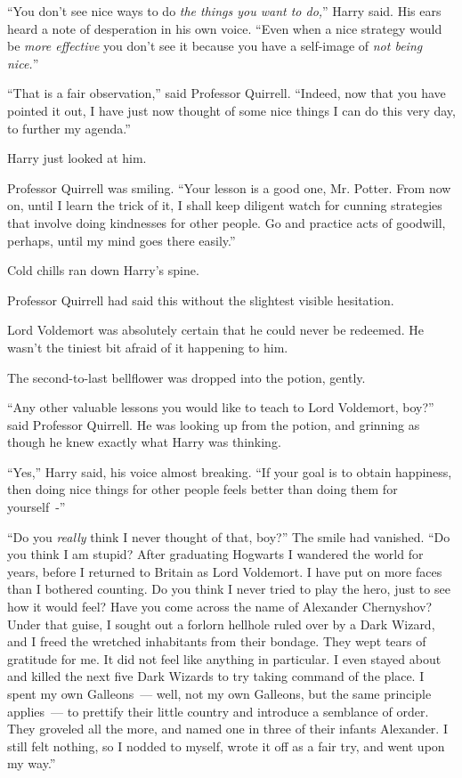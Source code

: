 ``You don't see nice ways to do \emph{the things you want to do,}'' Harry said. His ears heard a note of desperation in his own voice. ``Even when a nice strategy would be \emph{more effective} you don't see it because you have a self-image of \emph{not being nice.}''

``That is a fair observation,'' said Professor Quirrell. ``Indeed, now that you have pointed it out, I have just now thought of some nice things I can do this very day, to further my agenda.''

Harry just looked at him.

Professor Quirrell was smiling. ``Your lesson is a good one, Mr. Potter. From now on, until I learn the trick of it, I shall keep diligent watch for cunning strategies that involve doing kindnesses for other people. Go and practice acts of goodwill, perhaps, until my mind goes there easily.''

Cold chills ran down Harry's spine.

Professor Quirrell had said this without the slightest visible hesitation.

Lord Voldemort was absolutely certain that he could never be redeemed. He wasn't the tiniest bit afraid of it happening to him.

The second-to-last bellflower was dropped into the potion, gently.

``Any other valuable lessons you would like to teach to Lord Voldemort, boy?'' said Professor Quirrell. He was looking up from the potion, and grinning as though he knew exactly what Harry was thinking.

``Yes,'' Harry said, his voice almost breaking. ``If your goal is to obtain happiness, then doing nice things for other people feels better than doing them for yourself~-''

``Do you \emph{really} think I never thought of that, boy?'' The smile had vanished. ``Do you think I am stupid? After graduating Hogwarts I wandered the world for years, before I returned to Britain as Lord Voldemort. I have put on more faces than I bothered counting. Do you think I never tried to play the hero, just to see how it would feel? Have you come across the name of Alexander Chernyshov? Under that guise, I sought out a forlorn hellhole ruled over by a Dark Wizard, and I freed the wretched inhabitants from their bondage. They wept tears of gratitude for me. It did not feel like anything in particular. I even stayed about and killed the next five Dark Wizards to try taking command of the place. I spent my own Galleons~--- well, not my own Galleons, but the same principle applies~--- to prettify their little country and introduce a semblance of order. They groveled all the more, and named one in three of their infants Alexander. I still felt nothing, so I nodded to myself, wrote it off as a fair try, and went upon my way.''

